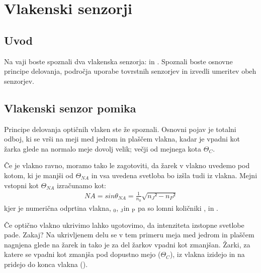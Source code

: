 \documentclass[letterpaper,10pt,english]{sphinxmanual}
\begin{document}
\chapter{Vlakenski senzorji}
\label{\detokenize{vlakenski_senzorji:vlakenski-senzorji}}\label{\detokenize{vlakenski_senzorji:id1}}\label{\detokenize{vlakenski_senzorji::doc}}

\section{Uvod}
\label{\detokenize{vlakenski_senzorji:uvod}}
\sphinxAtStartPar
Na vaji boste spoznali dva vlakenska senzorja:  in . Spoznali boste osnovne principe delovanja, področja uporabe tovrstnih senzorjev in izvedli umeritev obeh senzorjev.


\section{Vlakenski senzor pomika}
\label{\detokenize{vlakenski_senzorji:vlakenski-senzor-pomika}}
\sphinxAtStartPar
Principe delovanja optičnih vlaken ste že spoznali. Osnovni pojav je totalni odboj, ki se vrši na meji med jedrom in plaščem vlakna, kadar je vpadni kot žarka glede na normalo meje dovolj velik; večji od mejnega kota \({\Theta_C}\).

\sphinxAtStartPar
Če je vlakno ravno, moramo tako le zagotoviti, da žarek v vlakno uvedemo pod kotom, ki je manjši od \({\Theta_{NA}}\) in vsa uvedena svetloba bo izšla tudi iz vlakna. Mejni vstopni kot \({\Theta_{NA}}\) izračunamo kot:
\begin{equation*}
\begin{split}NA = sin \theta_{NA} = \frac{1}{n_0} \sqrt{n_J ² - n_P ²}\end{split}
\end{equation*}
\sphinxAtStartPar
kjer je  numerična odprtina vlakna, $_{\text{0}}$,  $_{\text{J}}$in $_{\text{P}}$ pa so lomni količniki ,  in .

\sphinxAtStartPar
Če optično vlakno ukrivimo lahko ugotovimo, da intenziteta izstopne svetlobe pade. Zakaj? Na ukrivljenem delu se v tem primeru meja med jedrom in plaščem nagnjena glede na žarek in tako je za del žarkov vpadni kot zmanjšan. Žarki, za katere se vpadni kot zmanjša pod dopustno mejo (\({\Theta_C}\)), iz vlakna izidejo in na pridejo do konca vlakna ().
\end{document}
